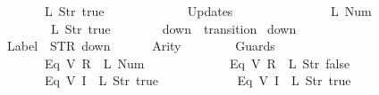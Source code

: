 \begin{isabellebody}
\ \ \ \ \ \ \ \ \ \ \ \ {\isacharparenleft}L\ {\isacharparenleft}Str\ {\isacharprime}{\isacharprime}true{\isacharprime}{\isacharprime}{\isacharparenright}{\isacharparenright}\isanewline
\ \ \ \ \ \ {\isacharbrackright}{\isacharcomma}\isanewline
\ \ \ \ \ \ Updates\ {\isacharequal}\ {\isacharbrackleft}\isanewline
\ \ \ \ \ \ \ \ \ \ \ \ {\isacharparenleft}{}{\isacharcomma}\ {\isacharparenleft}L\ {\isacharparenleft}Num\ {}{\isacharparenright}{\isacharparenright}{\isacharparenright}{\isacharcomma}\isanewline
\ \ \ \ \ \ \ \ \ \ \ \ {\isacharparenleft}{}{\isacharcomma}\ {\isacharparenleft}L\ {\isacharparenleft}Str\ {\isacharprime}{\isacharprime}true{\isacharprime}{\isacharprime}{\isacharparenright}{\isacharparenright}{\isacharparenright}\isanewline
\ \ \ \ \ \ {\isacharbrackright}\isanewline
{\isasymrparr}{\isachardoublequoteclose}\isanewline
\isanewline
{}\isamarkupfalse%
\ {\isachardoublequoteopen}down{}{}{\isachardoublequoteclose}\ {\isacharcolon}{\isacharcolon}\ {\isachardoublequoteopen}transition{\isachardoublequoteclose}\ \isanewline
{\isachardoublequoteopen}down{}{}\ {\isasymequiv}\ {\isasymlparr}\isanewline
\ \ \ \ \ \ Label\ {\isacharequal}\ STR\ {\isacharprime}{\isacharprime}down{\isacharprime}{\isacharprime}{\isacharcomma}\isanewline
\ \ \ \ \ \ Arity\ {\isacharequal}\ {}{\isacharcomma}\isanewline
\ \ \ \ \ \ Guards\ {\isacharequal}\ {\isacharbrackleft}\isanewline
\ \ \ \ \ \ \ \ \ \ \ \ {\isacharparenleft}Eq\ {\isacharparenleft}V\ {\isacharparenleft}R\ {}{\isacharparenright}{\isacharparenright}\ {\isacharparenleft}L\ {\isacharparenleft}Num\ {}{\isacharparenright}{\isacharparenright}{\isacharparenright}{\isacharcomma}\isanewline
\ \ \ \ \ \ \ \ \ \ \ \ {\isacharparenleft}Eq\ {\isacharparenleft}V\ {\isacharparenleft}R\ {}{\isacharparenright}{\isacharparenright}\ {\isacharparenleft}L\ {\isacharparenleft}Str\ {\isacharprime}{\isacharprime}false{\isacharprime}{\isacharprime}{\isacharparenright}{\isacharparenright}{\isacharparenright}{\isacharcomma}\isanewline
\ \ \ \ \ \ \ \ \ \ \ \ {\isacharparenleft}Eq\ {\isacharparenleft}V\ {\isacharparenleft}I\ {}{\isacharparenright}{\isacharparenright}\ {\isacharparenleft}L\ {\isacharparenleft}Str\ {\isacharprime}{\isacharprime}true{\isacharprime}{\isacharprime}{\isacharparenright}{\isacharparenright}{\isacharparenright}{\isacharcomma}\isanewline
\ \ \ \ \ \ \ \ \ \ \ \ {\isacharparenleft}Eq\ {\isacharparenleft}V\ {\isacharparenleft}I\ {}{\isacharparenright}{\isacharparenright}\ {\isacharparenleft}L\ {\isacharparenleft}Str\ {\isacharprime}{\isacharprime}true{\isacharprime}{\isacharprime}{\isacharparenright}{\isacharparenright}{\isacharparenright}{\isacharcomma}\isanewline

\end{isabellebody}
